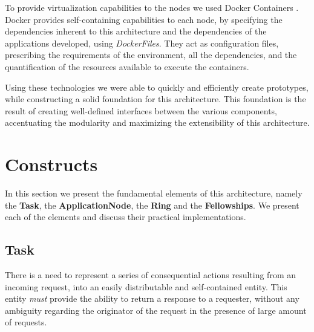 \documentclass[12pt, titlepage]{uo_temp}
\begin{document}
     To provide virtualization capabilities to the nodes we used Docker Containers
     \cite{docker}. Docker provides self-containing capabilities to each node, by
     specifying the dependencies inherent to this architecture and the dependencies of the
     applications developed, using \emph{DockerFiles}. They act as configuration files,
     prescribing the requirements of the environment, all the dependencies, and the
     quantification of the resources available to execute the containers.

     Using these technologies we were able to quickly and efficiently create
     prototypes, while constructing a solid foundation for this architecture. This
     foundation is the result of creating well-defined interfaces between the various
     components, accentuating the modularity and maximizing the extensibility of this
     architecture.

     \section{Constructs}
     In this section we present the fundamental elements of this architecture, namely
     the \textbf{Task}, the \textbf{ApplicationNode}, the \textbf{Ring} and the
     \textbf{Fellowships}.  We present each of the elements and discuss their
     practical implementations.

     \subsection{Task}\label{impl_constructs_task}
     There is a need to represent a series of consequential actions resulting from an
     incoming request, into an easily distributable and self-contained entity. This entity
     \emph{must} provide the ability to return a response to a requester, without any
     ambiguity regarding the originator of the request in the presence of large amount of
     requests.
\end{document}
